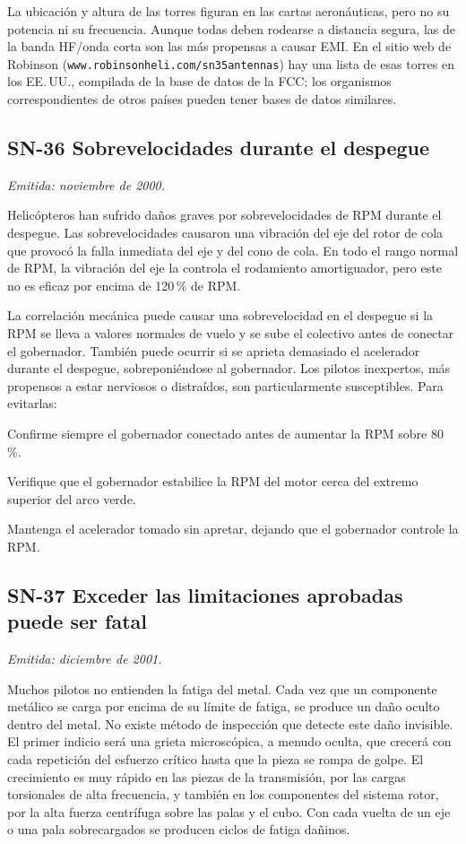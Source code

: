 La ubicación y altura de las torres figuran en las cartas aeronáuticas, pero no su potencia ni su frecuencia. Aunque todas deben rodearse a distancia segura, las de la banda HF/onda corta son las más propensas a causar EMI. En el sitio web de Robinson (\texttt{www.robinsonheli.com/sn35antennas}) hay una lista de esas torres en los EE.\,UU., compilada de la base de datos de la FCC; los organismos correspondientes de otros países pueden tener bases de datos similares.

\subsection*{SN-36 \quad Sobrevelocidades durante el despegue}
{\small\textit{Emitida: noviembre de 2000.}}

Helicópteros han sufrido daños graves por sobrevelocidades de RPM durante el despegue. Las sobrevelocidades causaron una vibración del eje del rotor de cola que provocó la falla inmediata del eje y del cono de cola. En todo el rango normal de RPM, la vibración del eje la controla el rodamiento amortiguador, pero este no es eficaz por encima de 120\,\% de RPM.

La correlación mecánica puede causar una sobrevelocidad en el despegue si la RPM se lleva a valores normales de vuelo y se sube el colectivo antes de conectar el gobernador. También puede ocurrir si se aprieta demasiado el acelerador durante el despegue, sobreponiéndose al gobernador. Los pilotos inexpertos, más propensos a estar nerviosos o distraídos, son particularmente susceptibles. Para evitarlas:

\begin{pasos}
\item Confirme siempre el gobernador conectado antes de aumentar la RPM sobre 80\,\%.
\item Verifique que el gobernador estabilice la RPM del motor cerca del extremo superior del arco verde.
\item Mantenga el acelerador tomado sin apretar, dejando que el gobernador controle la RPM.
\end{pasos}

\subsection*{SN-37 \quad Exceder las limitaciones aprobadas puede ser fatal}
{\small\textit{Emitida: diciembre de 2001.}}

Muchos pilotos no entienden la fatiga del metal. Cada vez que un componente metálico se carga por encima de su límite de fatiga, se produce un daño oculto dentro del metal. No existe método de inspección que detecte este daño invisible. El primer indicio será una grieta microscópica, a menudo oculta, que crecerá con cada repetición del esfuerzo crítico hasta que la pieza se rompa de golpe. El crecimiento es muy rápido en las piezas de la transmisión, por las cargas torsionales de alta frecuencia, y también en los componentes del sistema rotor, por la alta fuerza centrífuga sobre las palas y el cubo. Con cada vuelta de un eje o una pala sobrecargados se producen ciclos de fatiga dañinos.

